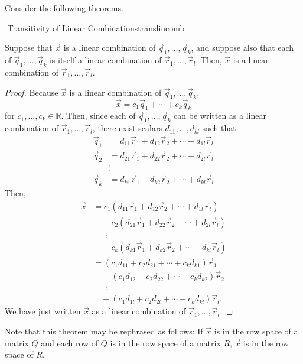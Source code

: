         \pagebreak
        \vphantom
        \\
        \\
        Consider the following theorems.
        \begin{theorem}{\Stop\,\,Transitivity of Linear Combinations}{translincomb}
        
            Suppose that \(\vec{x}\) is a linear combination of \(\vec{q}_1,\ldots,\vec{q}_k\), and suppose also that each of \(\vec{q}_1,\ldots,\vec{q}_k\) is itself a linear combination of \(\vec{r}_1,\ldots,\vec{r}_l\). Then, \(\vec{x}\) is a linear combination of \(\vec{r}_1,\ldots,\vec{r}_l\).
            \begin{proof}
                Because \(\vec{x}\) is a linear combination of \(\vec{q}_1,\ldots,\vec{q}_k\), 
                \begin{equation*}
                    \vec{x}=c_1\vec{q}_1+\cdots+c_k\vec{q}_k
                \end{equation*}
                for \(c_1,\ldots,c_k\in\mathbb{R}\). Then, since each of \(\vec{q}_1,\ldots,\vec{q}_k\) can be written as a linear combination of \(\vec{r}_1,\ldots,\vec{r}_l\), there exist scalars \(d_{11},\ldots,d_{kl}\) such that
                \begin{align*}
                    \vec{q}_1&=d_{11}\vec{r}_1+d_{12}\vec{r}_2+\cdots+d_{1l}\vec{r}_l \\
                    \vec{q}_2&=d_{21}\vec{r}_1+d_{22}\vec{r}_2+\cdots+d_{2l}\vec{r}_l \\
                    &\vdots \\
                    \vec{q}_k&=d_{k1}\vec{r}_1+d_{k2}\vec{r}_2+\cdots+d_{kl}\vec{r}_l
                \end{align*}
                Then,
                \begin{align*}
                    \vec{x}&=c_1(d_{11}\vec{r}_1+d_{12}\vec{r}_2+\cdots+d_{1l}\vec{r}_l) \\
                    &\quad+c_2(d_{21}\vec{r}_1+d_{22}\vec{r}_2+\cdots+d_{2l}\vec{r}_l) \\
                    &\quad\,\,\,\vdots \\
                    &\quad+c_k(d_{k1}\vec{r}_1+d_{k2}\vec{r}_2+\cdots+d_{kl}\vec{r}_l) \\
                    &=(c_1d_{11}+c_2d_{21}+\cdots+c_kd_{k1})\vec{r}_1 \\
                    &\quad+(c_1d_{12}+c_2d_{22}+\cdots+c_kd_{k2})\vec{r}_2 \\
                    &\quad\,\,\,\vdots \\\
                    &\quad+(c_1d_{1l}+c_2d_{2l}+\cdots+c_kd_{kl})\vec{r}_l.
                \end{align*}
                We have just written \(\vec{x}\) as a linear combination of \(\vec{r}_1,\ldots,\vec{r}_l\).
            \end{proof}
            Note that this theorem may be rephrased as follows: If \(\vec{x}\) is in the row space of a matrix \(Q\) and each row of \(Q\) is in the row space of a matrix \(R\), \(\vec{x}\) is in the row space of \(R\).
        \end{theorem}

